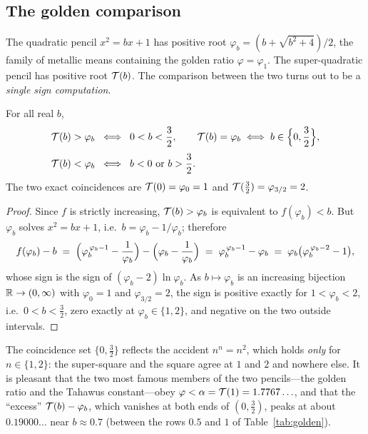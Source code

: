 \subsection{The golden comparison}

The quadratic pencil $x^{2} = bx + 1$ has positive root
$\varphi_b = (b + \sqrt{b^{2}+4})/2$, the family of metallic means
containing the golden ratio $\varphi = \varphi_1$. The super-quadratic
pencil has positive root $\mathcal{T}(b)$. The comparison between the two
turns out to be a \emph{single sign computation}.

\begin{theorem}\label{thm:golden}
For all real $b$,
\[
\begin{aligned}
    \mathcal{T}(b) > \varphi_b \;&\iff\; 0 < b < \frac32,
    \qquad
    \mathcal{T}(b) = \varphi_b \iff b \in \Bigl\{0, \frac32\Bigr\},\\[1mm]
    \mathcal{T}(b) < \varphi_b \;&\iff\; b < 0 \text{ or } b > \frac32 .
\end{aligned}
\]
The two exact coincidences are $\mathcal{T}(0) = \varphi_{0} = 1$ and
$\mathcal{T}(\tfrac32) = \varphi_{3/2} = 2$.
\end{theorem}

\begin{proof}
Since $f$ is strictly increasing, $\mathcal{T}(b) > \varphi_b$ is equivalent
to $f(\varphi_b) < b$. But $\varphi_b$ solves $x^{2} = bx+1$, i.e.\
$b = \varphi_b - 1/\varphi_b$; therefore
\[
    f(\varphi_b) - b
    \;=\; \Bigl(\varphi_b^{\,\varphi_b - 1} - \frac{1}{\varphi_b}\Bigr)
    - \Bigl(\varphi_b - \frac{1}{\varphi_b}\Bigr)
    \;=\; \varphi_b^{\,\varphi_b - 1} - \varphi_b
    \;=\; \varphi_b \bigl(\varphi_b^{\,\varphi_b - 2} - 1\bigr),
\]
whose sign is the sign of $(\varphi_b - 2)\ln\varphi_b$. As
$b \mapsto \varphi_b$ is an increasing bijection $\mathbb{R} \to (0,\infty)$
with $\varphi_0 = 1$ and $\varphi_{3/2} = 2$, the sign is positive
exactly for $1 < \varphi_b < 2$, i.e.\ $0 < b < \tfrac32$, zero exactly
at $\varphi_b \in \{1,2\}$, and negative on the two outside intervals.
\end{proof}

\begin{remark}
The coincidence set $\{0, \tfrac32\}$ reflects the accident
$n^{n} = n^{2}$, which holds \emph{only} for $n \in \{1,2\}$: the
super-square and the square agree at $1$ and $2$ and nowhere else. It
is pleasant that the two most famous members of the two pencils---the
golden ratio and the Tahawus constant---obey
$\varphi < \alpha = \mathcal{T}(1) = 1.7767\ldots$, and that the ``excess''
$\mathcal{T}(b) - \varphi_b$, which vanishes at both ends of
$(0,\tfrac32)$, peaks at about $0.19000\ldots$ near $b \approx 0.7$
(between the rows $0.5$ and $1$ of Table~\ref{tab:golden}).
\end{remark}


